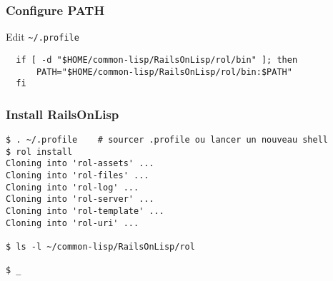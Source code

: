 \documentclass[8pt]{beamer}
\begin{document}
\begin{frame}[fragile]
  \frametitle{Configure PATH}
  Edit \tt{\textasciitilde/.profile}
\begin{verbatim}
  if [ -d "$HOME/common-lisp/RailsOnLisp/rol/bin" ]; then
      PATH="$HOME/common-lisp/RailsOnLisp/rol/bin:$PATH"
  fi
\end{verbatim}
\end{frame}

\begin{frame}[fragile]
  \frametitle{Install RailsOnLisp}
\begin{verbatim}
$ . ~/.profile    # sourcer .profile ou lancer un nouveau shell
$ rol install
Cloning into 'rol-assets' ...
Cloning into 'rol-files' ...
Cloning into 'rol-log' ...
Cloning into 'rol-server' ...
Cloning into 'rol-template' ...
Cloning into 'rol-uri' ...

$ ls -l ~/common-lisp/RailsOnLisp/rol

$ _
\end{verbatim}
\end{frame}
\end{document}
